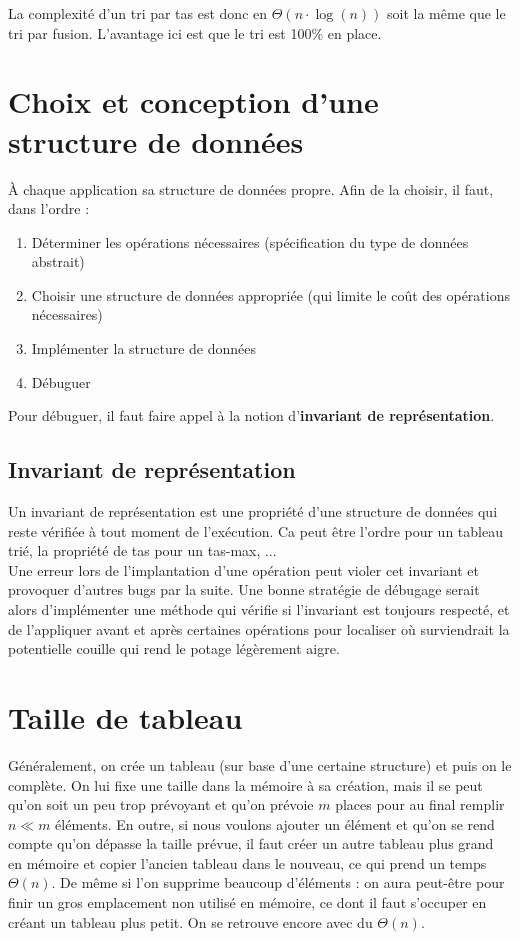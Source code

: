 \documentclass[12pt,a4paper]{book}
\begin{document}
La complexité d'un tri par tas est donc en $\Theta(n\cdot \log(n))$ soit la même que le tri par fusion. L'avantage ici est que le tri est 100\% en place.



\section{Choix et conception d'une structure de données}
À chaque application sa structure de données propre. Afin de la choisir, il faut, dans l'ordre :
\begin{enumerate}
\item Déterminer les opérations nécessaires (spécification du type de données abstrait)
\item Choisir une structure de données appropriée (qui limite le coût des opérations nécessaires)
\item Implémenter la structure de données
\item Débuguer
\end{enumerate}
Pour débuguer, il faut faire appel à la notion d'\textbf{invariant de représentation}.
\subsection*{Invariant de représentation}
Un invariant de représentation est une propriété d'une structure de données qui reste vérifiée à tout moment de l'exécution. Ca peut être l'ordre pour un tableau trié, la propriété de tas pour un tas-max, ... \\

Une erreur lors de l'implantation d'une opération peut violer cet invariant et provoquer d'autres bugs par la suite. Une bonne stratégie de débugage serait alors d'implémenter une méthode qui vérifie si l'invariant est toujours respecté, et de l'appliquer avant et après certaines opérations pour localiser où surviendrait la potentielle couille qui rend le potage légèrement aigre.
\section{Taille de tableau}
Généralement, on crée un tableau (sur base d'une certaine structure) et puis on le complète. On lui fixe une taille dans la mémoire à sa création, mais il se peut qu'on soit un peu trop prévoyant et qu'on prévoie $m$ places pour au final remplir $n\ll m$ éléments. En outre, si nous voulons ajouter un élément et qu'on se rend compte qu'on dépasse la taille prévue, il faut créer un autre tableau plus grand en mémoire et copier l'ancien tableau dans le nouveau, ce qui prend un temps $\Theta(n)$. De même si l'on supprime beaucoup d'éléments : on aura peut-être pour finir un gros emplacement non utilisé en mémoire, ce dont il faut s'occuper en créant un tableau plus petit. On se retrouve encore avec du $\Theta(n)$.\\
\end{document}
